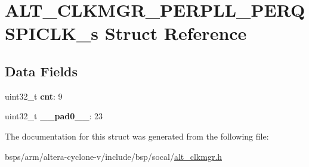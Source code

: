 \hypertarget{structALT__CLKMGR__PERPLL__PERQSPICLK__s}{}\section{A\+L\+T\+\_\+\+C\+L\+K\+M\+G\+R\+\_\+\+P\+E\+R\+P\+L\+L\+\_\+\+P\+E\+R\+Q\+S\+P\+I\+C\+L\+K\+\_\+s Struct Reference}
\label{structALT__CLKMGR__PERPLL__PERQSPICLK__s}
\subsection*{Data Fields}
\begin{DoxyCompactItemize}
\item 
\mbox{\label{structALT__CLKMGR__PERPLL__PERQSPICLK__s_a1fecff9138bde8305aafda1e0128ad46}} 
uint32\+\_\+t {\bfseries cnt}\+: 9
\item 
\mbox{\label{structALT__CLKMGR__PERPLL__PERQSPICLK__s_a5ba119483534cd0d426df60254958fe4}} 
uint32\+\_\+t {\bfseries \+\_\+\+\_\+pad0\+\_\+\+\_\+}\+: 23
\end{DoxyCompactItemize}


The documentation for this struct was generated from the following file\+:\begin{DoxyCompactItemize}
\item 
bsps/arm/altera-\/cyclone-\/v/include/bsp/socal/\mbox{\hyperlink{alt__clkmgr_8h}{alt\+\_\+clkmgr.\+h}}\end{DoxyCompactItemize}
